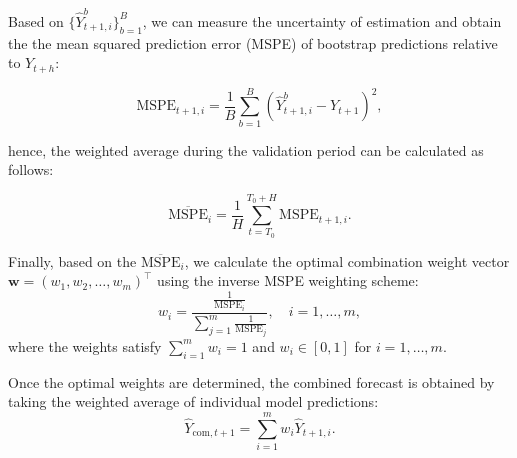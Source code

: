 \documentclass[12pt]{article}
\begin{document}
Based on $\{\hat{Y}_{t+1, i}^b\}_{b=1}^B$, we can measure the uncertainty of estimation and obtain the the mean squared prediction error (MSPE) of bootstrap predictions relative to $Y_{t+h}$:

\begin{equation}
    \text{MSPE}_{t+1,i} = \frac{1}{B} \sum_{b=1}^B \left( \hat{Y}_{t+1, i}^b - Y_{t+1} \right)^2,
\end{equation}

hence, the weighted average  during the validation period can be calculated as follows:

\begin{equation}
   \overline{\text{MSPE}}_i = \frac{1}{H} \sum_{t=T_0}^{T_0+H} \text{MSPE}_{t+1,i}.
\end{equation}

Finally, based on the $\overline{\text{MSPE}}_i$, we calculate the optimal combination weight vector $\boldsymbol{w} = (w_1, w_2, \dots, w_m)^\top$ using the inverse MSPE weighting scheme:
\begin{equation}
    w_i = \frac{\frac{1}{\text{MSPE}_i}}{\sum_{j=1}^{m} \frac{1}{\text{MSPE}_j}}, \quad i = 1, \dots, m,
\end{equation}
where the weights satisfy $\sum_{i=1}^m w_i = 1$ and $w_i \in [0,1]$ for $i = 1, \dots, m$.

Once the optimal weights are determined, the combined forecast is obtained by taking the weighted average of individual model predictions:
\begin{equation}
    \hat{Y}_{\text{com},t+1} = \sum_{i=1}^{m} w_i \hat{Y}_{t+1,i}.
\end{equation}

\end{document}
